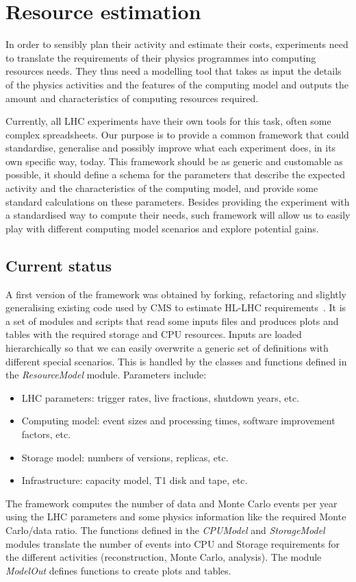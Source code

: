 \section{Resource estimation}
In order to sensibly plan their activity and estimate their costs,
experiments need to translate the requirements of their physics
programmes into computing resources needs. They thus need a modelling
tool that takes as input the details of the physics activities and the
features of the computing model and outputs the amount
and characteristics
of computing resources required.

Currently, all LHC experiments have their own tools for this task,
often some complex spreadsheets. Our purpose is to provide a common
framework that could standardise, generalise and possibly improve what
each experiment does, in its own specific way, today. This framework
should be as generic and customable as possible, it should define a
schema for the parameters that describe the expected activity and the
characteristics of the computing model, and provide some standard
calculations on these parameters.  Besides providing the experiment
with a standardised way to compute their needs, such framework will
allow us to easily play with different computing model scenarios and
explore potential gains.

\subsection{Current status}
A first version of the framework \cite{ourresmodel} was obtained by
forking, refactoring and slightly generalising existing code used by
CMS to estimate HL-LHC requirements~\cite{cmsresmodel}. It is a set of
modules and scripts that read some inputs files and produces plots and
tables with the required storage and CPU resources. Inputs are loaded
hierarchically so that we can easily overwrite a generic set of
definitions with different special scenarios. This is handled by the
classes and functions defined in the {\it ResourceModel}
module. Parameters include:
\begin{itemize}
\item LHC parameters: trigger rates, live fractions, shutdown years, etc.
\item Computing model: event sizes and processing times, software improvement factors, etc.
\item Storage model: numbers of versions, replicas, etc.
\item Infrastructure: capacity model, T1 disk and tape, etc.
\end{itemize}
The framework computes the number of data and Monte Carlo events per
year using the LHC parameters and some physics information like the
required Monte Carlo/data ratio. The functions defined in the {\it
  CPUModel} and {\it StorageModel} modules translate the number of
events into CPU and Storage requirements for the different activities
(reconstruction, Monte Carlo, analysis).  The module {\it ModelOut}
defines functions to create plots and tables.

